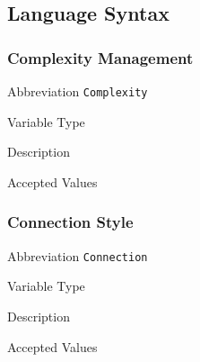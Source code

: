 
\subsection{Language Syntax}
\label{sec:languagesyntax}

\subsubsection{Complexity Management}
\label{subsec:complexity}

\begin{AlignedDesc}
  \item[Abbreviation] \texttt{Complexity}

  \item[Variable Type]

  \item[Description]

  \item[Accepted Values]

  \begin{AlignedDesc}
    \item[\textellipsis]
  \end{AlignedDesc}

\end{AlignedDesc}

\subsubsection{Connection Style}
\label{subsec:connection}

\begin{AlignedDesc}
  \item[Abbreviation] \texttt{Connection}

  \item[Variable Type]

  \item[Description]

  \item[Accepted Values]

  \begin{AlignedDesc}
    \item[\textellipsis]
  \end{AlignedDesc}

\end{AlignedDesc}

